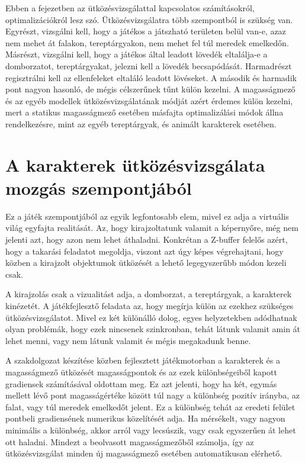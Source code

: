 \label{Chap:utkozesvizsgalat}

Ebben a fejezetben az ütközésvizsgálattal kapcsolatos számításokról, optimalizációkról lesz szó. Ütközésvizsgálatra több szempontból is szükség van. Egyrészt, vizsgálni kell, hogy a játékos a játszható területen belül van-e, azaz nem mehet át falakon, tereptárgyakon, nem mehet fel túl meredek emelkedőn. Másrészt, vizsgálni kell, hogy a játékos által leadott lövedék eltalálja-e a domborzatot, tereptárgyakat, jelezni kell a lövedék becsapódását. Harmadrészt regisztrálni kell az ellenfeleket eltaláló leadott lövéseket. A második és harmadik pont nagyon hasonló, de mégis célszerűnek tűnt külön kezelni. A magasságmező és az egyéb modellek ütközésvizsgálatának módját azért érdemes külön kezelni, mert a statikus magasságmező esetében másfajta optimalizálási módok állna rendelkezésre, mint az egyéb tereptárgyak, és animált karakterek esetében.

\section{A karakterek ütközésvizsgálata mozgás szempontjából}

Ez a játék szempontjából az egyik legfontosabb elem, mivel ez adja a virtuális világ egyfajta realitását. Az, hogy kirajzoltatunk valamit a képernyőre, még nem jelenti azt, hogy azon nem lehet áthaladni. Konkrétan a Z-buffer felelős azért, hogy a takarási feladatot megoldja, viszont azt úgy képes végrehajtani, hogy közben a kirajzolt objektumok ütközését a lehető legegyszerűbb módon kezeli csak.

A kirajzolás csak a vizualitást adja, a domborzat, a tereptárgyak, a karakterek kinézetét. A játékfejlesztő feladata az, hogy megírja külön az ezekhez szükséges ütközésvizsgálatot. Mivel ez két különálló dolog, egyes helyzetekben adódhatnak olyan problémák, hogy ezek nincsenek szinkronban, tehát látunk valamit amin át lehet menni, vagy nem látunk valamit és mégis megakadunk benne.

A szakdolgozat készítése közben fejlesztett játékmotorban a karakterek és a magasságmező ütközését magasságpontok és az ezek különbségeiből kapott gradiensek számításával oldottam meg. Ez azt jelenti, hogy ha két, egymás mellett lévő pont magasságértéke között túl nagy a különbség pozitív irányba, az falat, vagy túl meredek emelkedőt jelent. Ez a különbség tehát az eredeti felület pontbeli gradiensének numerikus közelítését adja. Ha mérsékelt, vagy nagyon minimális a különbség, akkor arról vagy lecsúszik, vagy csak egyszerűen át lehet ott haladni. Mindezt a beolvasott magasságmezőből számolja, így az ütközésvizsgálat minden új magasságmező esetében automatikusan elérhető.

